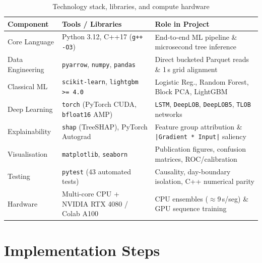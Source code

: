 \documentclass[12pt,a4paper,oneside]{report}
\newcommand{\code}[1]{\texttt{#1}}
\begin{document}
\begin{table}[H]
\centering\small
\caption{Technology stack, libraries, and compute hardware}
\label{tab:tech_stack}
\begin{tabularx}{\linewidth}{@{}>{\raggedright\arraybackslash}p{3.4cm}>{\raggedright\arraybackslash}p{4.3cm}>{\raggedright\arraybackslash}X@{}}
\toprule
\textbf{Component} & \textbf{Tools / Libraries} & \textbf{Role in Project} \\
\midrule
Core Language & Python 3.12, C++17 (\code{g++ -O3}) & End-to-end ML pipeline \& microsecond tree inference \\
Data Engineering & \code{pyarrow}, \code{numpy}, \code{pandas} & Direct bucketed Parquet reads \& 1\,s grid alignment \\
Classical ML & \code{scikit-learn}, \code{lightgbm >= 4.0} & Logistic Reg., Random Forest, Block PCA, LightGBM \\
Deep Learning & \code{torch} (PyTorch CUDA, \code{bfloat16} AMP) & \code{LSTM}, \code{DeepLOB}, \code{DeepLOB5}, \code{TLOB} networks \\
Explainability & \code{shap} (TreeSHAP), PyTorch Autograd & Feature group attribution \& \code{|Gradient * Input|} saliency \\
Visualisation & \code{matplotlib}, \code{seaborn} & Publication figures, confusion matrices, ROC/calibration \\
Testing & \code{pytest} (43 automated tests) & Causality, day-boundary isolation, C++ numerical parity \\
Hardware & Multi-core CPU + NVIDIA RTX 4080 / Colab A100 & CPU ensembles ($\approx$9\,s/seg) \& GPU sequence training \\
\bottomrule
\end{tabularx}
\end{table}

\section{Implementation Steps}
\end{document}
